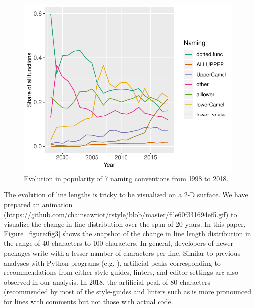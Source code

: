 \begin{figure}[htbp]
  \centering
  \includegraphics{fig2}
  \caption{Evolution in popularity of 7 naming conventions from 1998 to 2018.}
  \label{figure:fig2}
\end{figure}

The evolution of line lengths is tricky to be visualized on a 2-D surface. We have prepared an animation (\url{https://github.com/chainsawriot/rstyle/blob/master/file60f331694ef5.gif}) to visualize the change in line distribution over the span of 20 years. In this paper, Figure~\ref{figure:fig3} shows the snapshot of the change in line length distribution in the range of 40 characters to 100 characters. In general, developers of newer packages write with a lesser number of characters per line. Similar to previous analyses with Python programs (e.g. \citet{vanderplas}), artificial peaks corresponding to recommendations from either style-guides, linters, and editor settings are also observed in our analysis. In 2018, the artificial peak of 80 characters (recommended by most of the style-guides and linters such as  is more pronounced for lines with comments but not those with actual code.


